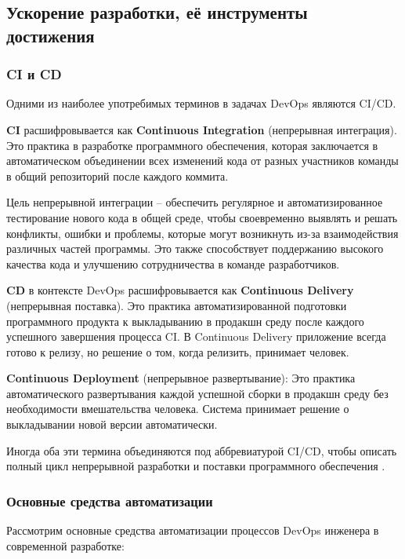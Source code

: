 \documentclass[referat]{SCWorks}
\begin{document}
\subsection{Ускорение разработки, её инструменты достижения}
\subsubsection{CI и CD}
Одними из наиболее употребимых терминов в задачах DevOps являются CI/CD. 

\textbf{CI} расшифровывается как \textbf{Continuous Integration} (непрерывная интеграция). Это практика в разработке программного обеспечения, которая заключается в автоматическом объединении всех изменений кода от разных участников команды в общий репозиторий после каждого коммита.

Цель непрерывной интеграции -- обеспечить регулярное и автоматизированное тестирование нового кода в общей среде, чтобы своевременно выявлять и решать конфликты, ошибки и проблемы, которые могут возникнуть из-за взаимодействия различных частей программы. Это также способствует поддержанию высокого качества кода и улучшению сотрудничества в команде разработчиков.

\textbf{CD} в контексте DevOps расшифровывается как \textbf{Continuous Delivery} (непрерывная поставка). Это практика автоматизированной подготовки программного продукта к выкладыванию в продакшн среду после каждого успешного завершения процесса CI. В Continuous Delivery приложение всегда готово к релизу, но решение о том, когда релизить, принимает человек.

\textbf{Continuous Deployment} (непрерывное развертывание): Это практика автоматического развертывания каждой успешной сборки в продакшн среду без необходимости вмешательства человека. Система принимает решение о выкладывании новой версии автоматически.

Иногда оба эти термина объединяются под аббревиатурой CI/CD, чтобы описать полный цикл непрерывной разработки и поставки программного обеспечения \cite{HabrCICD}.

\subsubsection{Основные средства автоматизации}
Рассмотрим основные средства автоматизации процессов DevOps инженера в современной разработке:
\end{document}
